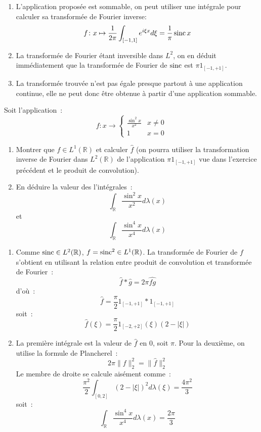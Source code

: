 \documentclass[a4paper, 12pt]{amsart}
\begin{document}
\begin{enumerate}
 \item L'application proposée est sommable, on peut utiliser une intégrale pour
calculer sa transformée de Fourier inverse:
\[
 f \colon x \mapsto \frac{1}{2\pi}\int_{[-1,1]} e^{i \xi x } d \xi =
\frac{1}{\pi}\operatorname*{sinc} x
\]
\item La transformée de Fourier étant inversible dans $L^2$, on en déduit
immédiatement que la transformée de Fourier de $\operatorname*{sinc}$ est $\pi 1_{[-1,+1]}$.
\item La transformée trouvée n'est pas égale presque partout à une application
continue, elle ne peut donc
être obtenue à partir d'une application sommable.
\end{enumerate}
\begin{fex}
 Soit l'application~:
\[
f : x \to \left \{
\begin{array}{ll}
\frac{\sin^2 x }{x^2} & x \neq 0 \\
1 & x = 0
\end{array}
\right .
\]
\begin{enumerate}
\item Montrer que $f \in L^1(\mathbb{R})$ et calculer $\widehat{f}$
(on pourra utiliser la transformation inverse de Fourier dans
$L^2(\mathbb{R})$ de l'application $\pi 1_{[-1,+1]}$ vue dans l'exercice
précédent et le produit de convolution).
\item En déduire la valeur des l'intégrales~:
\[
\int_{\mathbb{R}} \frac{\sin^2 x}{x^2} d \lambda(x)
\]
et
\[
\int_{\mathbb{R}} \frac{\sin^4 x}{x^4} d \lambda(x)
\]
\end{enumerate}
\end{fex}
\begin{enumerate}
\item 
Comme $\operatorname*{sinc} \in L^2(\mathbb{R})$, $f=\operatorname*{sinc}^2  \in L^1(\mathbb{R})$. La
transformée de Fourier de $f$ s'obtient en utilisant la relation entre
produit de convolution et transformée de Fourier~:
\[
\widehat{f}*\widehat{g} = 2 \pi \widehat{fg}
\]
d'où~:
\[
\widehat{f} = \frac{\pi}{2} 1_{[-1,+1]} * 1_{[-1,+1]}
\]
soit~:
\[
\widehat{f}(\xi) = \frac{\pi}{2} 1_{[-2,+2]}(\xi)(2-|\xi|)
\]

\item La première intégrale est la valeur de $\widehat{f}$ en 0, soit
$\pi$. Pour la deuxième, on utilise la formule de Plancherel~: 
\[
2 \pi \|f\|_2^2 = \| \widehat{f} \|_2^2
\]
Le membre de droite se calcule aisément comme~:
\[
\frac{\pi^2}{2} \int_{[0,2]}(2-|\xi|)^2 d \lambda(\xi) = \frac{4 \pi^2}{3}
\]
soit~:
\[
\int_{\mathbb{R}} \frac{\sin^4 x}{x^4} d \lambda(x) = \frac{2 \pi}{3}
\]
\end{enumerate}
\end{document}
